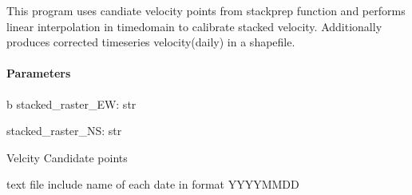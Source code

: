 \documentclass[letterpaper,10pt,english]{sphinxmanual}
\begin{document}
\begin{fulllineitems}
\label{\detokenize{akhdefo_functions:akhdefo_functions.Akhdefo_TS.Time_Series}}
\pysigstartsignatures
{}
\pysigstopsignatures
\sphinxAtStartPar
This program uses candiate velocity points from stackprep function and performs linear interpolation in time\sphinxhyphen{}domain to calibrate
stacked velocity. Additionally produces corrected timeseries velocity(daily) in a shapefile.


\paragraph{Parameters}
\label{\detokenize{akhdefo_functions:id9}}
\sphinxAtStartPar
b   
stacked\_raster\_EW: str

\sphinxAtStartPar
stacked\_raster\_NS: str
\begin{description}
\sphinxAtStartPar
Velcity Candidate points

\sphinxAtStartPar
text file include name of each date in format YYYYMMDD

\end{description}


\end{fulllineitems}
\end{document}
